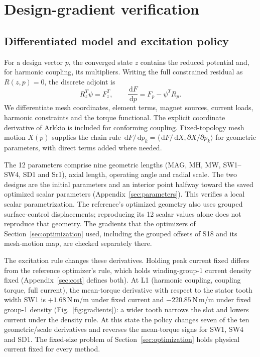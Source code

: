 \documentclass{anvil-paper}
\newcommand{\dd}{\,\mathrm{d}}
\begin{document}


\section{Design-gradient verification}\label{sec:gradients}
\subsection{Differentiated model and excitation policy}
For a design vector $p$, the converged state $z$ contains the reduced
potential and, for harmonic coupling, its multipliers. Writing the full
constrained residual as $R(z,p)=0$, the discrete adjoint is
\begin{equation}
 R_z^T\psi=F_z^T,\qquad
 \frac{\dd F}{\dd p}=F_p-\psi^T R_p.
 \label{eq:adjoint}
\end{equation}
We differentiate mesh coordinates, element terms, magnet sources, current
loads, harmonic constraints and the torque functional. The explicit
coordinate derivative of Arkkio is included for conforming coupling.
Fixed-topology mesh motion $X(p)$ supplies the chain rule
$\dd F/\dd p_k=\langle\dd F/\dd X,\partial X/\partial p_k\rangle$
for geometric parameters, with direct terms added where needed.

The 12 parameters comprise nine geometric lengths (MAG, MH, MW,
SW1--SW4, SD1 and Sr1), axial length, operating angle and radial scale.
The two designs are the initial parameters and an interior point halfway
toward the saved optimized scalar parameters
(Appendix~\ref{sec:parameters}). This verifies a local scalar
parametrization. The reference's optimized geometry also uses grouped
surface-control displacements; reproducing its 12 scalar values alone
does not reproduce that geometry. The gradients that the optimizers of
Section~\ref{sec:optimization} used, including the grouped offsets of S18
and its mesh-motion map, are checked separately there.

The excitation rule changes these derivatives. Holding peak current fixed
differs from the reference optimizer's rule, which holds winding-group-1
current density fixed (Appendix~\ref{sec:cost} defines both). At L1
(harmonic coupling, coupling torque, full current), the mean-torque
derivative with respect to the stator tooth width SW1 is $+1.68$\,N\,m/m
under fixed current and $-220.85$\,N\,m/m under fixed group-1 density
(Fig.~\ref{fig:gradients}): a wider tooth narrows the slot and lowers
current under the density rule. At this state the policy changes seven of
the ten geometric/scale derivatives and reverses the mean-torque signs for
SW1, SW4 and SD1. The fixed-size problem of Section~\ref{sec:optimization}
holds physical current fixed for every method.
\end{document}
